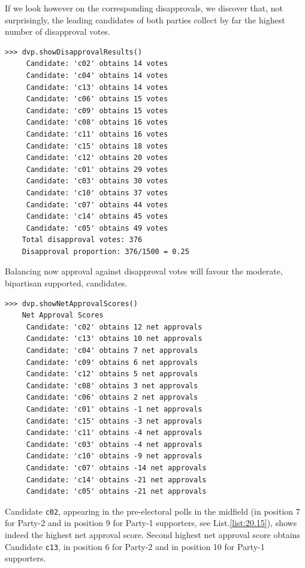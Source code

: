If we look however on the corresponding disapprovals, we discover that, not surprisingly, the leading candidates of both parties collect by far the highest number of disapproval votes. 
\begin{lstlisting}
>>> dvp.showDisapprovalResults()
     Candidate: 'c02' obtains 14 votes
     Candidate: 'c04' obtains 14 votes
     Candidate: 'c13' obtains 14 votes
     Candidate: 'c06' obtains 15 votes
     Candidate: 'c09' obtains 15 votes
     Candidate: 'c08' obtains 16 votes
     Candidate: 'c11' obtains 16 votes
     Candidate: 'c15' obtains 18 votes
     Candidate: 'c12' obtains 20 votes
     Candidate: 'c01' obtains 29 votes
     Candidate: 'c03' obtains 30 votes
     Candidate: 'c10' obtains 37 votes
     Candidate: 'c07' obtains 44 votes
     Candidate: 'c14' obtains 45 votes
     Candidate: 'c05' obtains 49 votes
    Total disapproval votes: 376
    Disapproval proportion: 376/1500 = 0.25
\end{lstlisting}

Balancing now approval against disapproval votes will favour the moderate, bipartisan supported, candidates.
\begin{lstlisting}
>>> dvp.showNetApprovalScores()
    Net Approval Scores
     Candidate: 'c02' obtains 12 net approvals
     Candidate: 'c13' obtains 10 net approvals
     Candidate: 'c04' obtains 7 net approvals
     Candidate: 'c09' obtains 6 net approvals
     Candidate: 'c12' obtains 5 net approvals
     Candidate: 'c08' obtains 3 net approvals
     Candidate: 'c06' obtains 2 net approvals
     Candidate: 'c01' obtains -1 net approvals
     Candidate: 'c15' obtains -3 net approvals
     Candidate: 'c11' obtains -4 net approvals
     Candidate: 'c03' obtains -4 net approvals
     Candidate: 'c10' obtains -9 net approvals
     Candidate: 'c07' obtains -14 net approvals
     Candidate: 'c14' obtains -21 net approvals
     Candidate: 'c05' obtains -21 net approvals
\end{lstlisting}

Candidate \texttt{c02}, appearing in the pre-electoral polls in the midfield (in position 7 for Party-2 and in position 9 for Party-1 supporters, see List.\vref{list:20.15}), shows indeed the highest net approval score. Second highest net approval score obtains Candidate \texttt{c13}, in  position 6 for Party-2 and in position 10 for Party-1 supporters.

